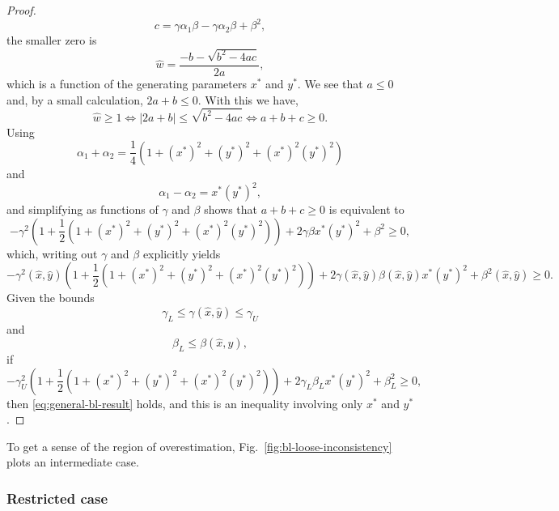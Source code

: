 \begin{proof}
\[\]
\[
c = \gamma \alpha_1 \beta - \gamma \alpha_2 \beta + \beta^2,
\]
the smaller zero is
\[
\hat{w} = \frac{-b - \sqrt{b^2 - 4ac}}{2a},
\]
which is a function of the generating parameters $x^*$ and $y^*$.
We see that $a \le 0$ and, by a small calculation, $2a+b \leq 0$.
With this we have,
\[
\hat{w} \ge 1 \iff
|2a + b| \leq \sqrt{b^2 - 4ac} \iff
a + b + c \ge 0.
\]
Using
\[
\alpha_1 + \alpha_2 = \frac{1}{4}\left(1+(x^*)^2+(y^*)^2+(x^*)^2(y^*)^2\right)
\]
and
\[
\alpha_1 - \alpha_2 = x^*(y^*)^2,
\]
and simplifying as functions of $\gamma$ and $\beta$ shows that $a + b + c \ge 0$ is equivalent to
\[
-\gamma^2\left(1 + \frac{1}{2}\left(1+(x^*)^2+(y^*)^2+(x^*)^2(y^*)^2\right)\right) + 2\gamma\beta x^*(y^*)^2 + \beta^2 \ge 0,
\]
which, writing out $\gamma$ and $\beta$ explicitly yields
\begin{equation}
\label{eq:general-bl-result}
-\gamma^2(\hat{x}, \hat{y})\left(1 + \frac{1}{2}\left(1+(x^*)^2+(y^*)^2+(x^*)^2(y^*)^2\right)\right) + 2\gamma(\hat{x}, \hat{y})\beta(\hat{x}, \hat{y})x^*(y^*)^2 + \beta^2(\hat{x}, \hat{y}) \ge 0.
\end{equation}
Given the bounds
\[
\gamma_{L} \le \gamma(\hat{x}, \hat{y}) \le \gamma_{U}
\]
and
\[
\beta_{L} \le \beta(\hat{x}, \hat{y}),
\]
if
\[
-\gamma_{U}^2\left(1 + \frac{1}{2}\left(1+(x^*)^2+(y^*)^2+(x^*)^2(y^*)^2\right)\right) + 2\gamma_{L}\beta_{L}x^*(y^*)^2 + \beta_{L}^2 \ge 0,
\]
then \eqref{eq:general-bl-result} holds, and this is an inequality involving only $x^*$ and $y^*$.
\end{proof}
To get a sense of the region of overestimation, Fig.~\ref{fig:bl-loose-inconsistency} plots an intermediate case.

\subsubsection*{Restricted case}

